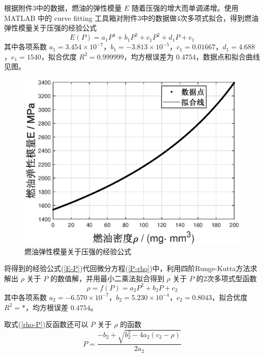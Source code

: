 \documentclass[12pt,a4paper]{article}
\begin{document}
根据附件3中的数据，燃油的弹性模量 $E$ 随着压强的增大而单调递增。使用 MATLAB 中的 curve fitting 工具箱对附件3中的数据做4次多项式拟合，得到燃油弹性模量关于压强的经验公式
\begin{equation}
\label{E-P}
E(P)=a_1P^4+b_1P^3+c_1P^2+d_1P+e_1
\end{equation}
其中各项系数 $a_1=3.454\times10^{-7}$，$b_1=-3.813\times10^{-5}$，$c_1=0.01667$，$d_1=4.688$，$e_1=1540$，拟合优度 $R^2=0.999999$，均方根误差为 $0.4754$，数据点和拟合曲线见图。
\begin{figure}[h]
\centering
\includegraphics[scale=0.75]{Problem_1_E_rho.eps}
\caption{燃油弹性模量关于压强的经验公式}\label{Problem_1_E_r}
\end{figure}

将得到的经验公式(\ref{E-P})代回微分方程(\ref{P-rho})中，利用四阶Runge-Kutta方法求解出 $\rho$ 关于 $P$ 的数值解，并用最小二乘法拟合得到 $\rho$ 关于 $P$ 的2次多项式型函数
\begin{equation}
\label{rho-P}
\rho=f(P)=a_2P^2+b_2P+c_2
\end{equation}
其中各项系数 $a_2=-6.570\times10^{-7}$，$b_2=5.230\times10^{-4}$，$c_2= 0.8043$，拟合优度 $R^2=*$，均方根误差 $0.4754$。

取式(\ref{rho-P})反函数还可以 $P$ 关于 $\rho$ 的函数
\begin{equation}
\label{P-rho2}
P=\frac{-b_2+\sqrt{b_2^2-4a_2(c_2-\rho)}}{2a_2}
\end{equation}
\end{document}
